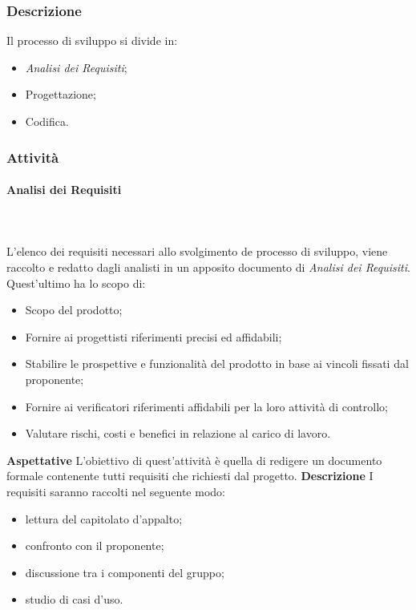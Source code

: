 		\subsubsection{Descrizione}
			Il processo di sviluppo si divide in:
				\begin{itemize}
					\item[] \textit{Analisi dei Requisiti};
					\item[] Progettazione;
					\item[] Codifica.
				\end{itemize}
		\subsubsection{Attività}
			\paragraph{Analisi dei Requisiti} \mbox{} \\ \mbox{} \\
			L'elenco dei requisiti necessari allo svolgimento de processo di sviluppo, viene raccolto e redatto dagli analisti in un apposito documento di \textit{Analisi dei Requisiti}. Quest'ultimo ha lo scopo di:
				\begin{itemize}
					\item[] Scopo del prodotto;
					\item[] Fornire ai progettisti riferimenti precisi ed affidabili;
					\item[] Stabilire le prospettive e funzionalità del prodotto in base ai vincoli fissati dal proponente;
					\item[] Fornire ai verificatori riferimenti affidabili per la loro attività di controllo;
					\item[] Valutare rischi, costi e benefici in relazione al carico di lavoro.
				\end{itemize} \newline
			\textbf{Aspettative} \newline \newline
			L'obiettivo di quest'attività è quella di redigere un documento formale contenente tutti requisiti che richiesti dal progetto.\newline \newline
			\textbf{Descrizione} \newline \newline
			I requisiti saranno raccolti nel seguente modo:
				\begin{itemize} \newline
					\item[] lettura del capitolato d'appalto;
					\item[] confronto con il proponente;
					\item[] discussione tra i componenti del gruppo;
					\item[] studio di casi d'uso.
				\end{itemize}
